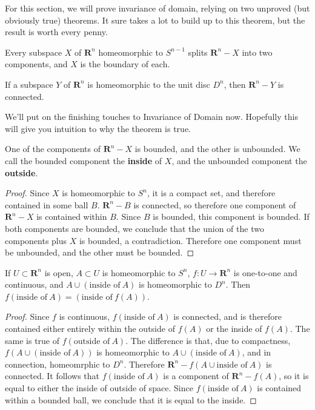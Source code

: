 For this section, we will prove invariance of domain, relying on two unproved (but obviously true) theorems. It sure takes a lot to build up to this theorem, but the result is worth every penny.

\begin{theorem}
    Every subspace $X$ of $\mathbf{R}^n$ homeomorphic to $S^{n-1}$ splits $\mathbf{R}^n - X$ into two components, and $X$ is the boundary of each.
\end{theorem}

\begin{theorem}
    If a subspace $Y$ of $\mathbf{R}^n$ is homeomorphic to the unit disc $D^n$, then $\mathbf{R}^n - Y$ is connected.
\end{theorem}

We'll put on the finishing touches to Invariance of Domain now. Hopefully this will give you intuition to why the theorem is true.

\begin{lemma}
    One of the components of $\mathbf{R}^n - X$ is bounded, and the other is unbounded. We call the bounded component the {\bf inside} of $X$, and the unbounded component the {\bf outside}.
\end{lemma}
\begin{proof}
    Since $X$ is homeomorphic to $S^n$, it is a compact set, and therefore contained in some ball $B$. $\mathbf{R}^n - B$ is connected, so therefore one component of $\mathbf{R}^n - X$ is contained within $B$. Since $B$ is bounded, this component is bounded. If both components are bounded, we conclude that the union of the two components plus $X$ is bounded, a contradiction. Therefore one component must be unbounded, and the other must be bounded.
\end{proof}

\begin{lemma}
    If $U \subset \mathbf{R}^n$ is open, $A \subset U$ is homeomorphic to $S^n$, $f:U \to \mathbf{R}^n$ is one-to-one and continuous, and $A \cup (\text{inside of}\ A)$ is homeomorphic to $D^n$. Then $f(\text{inside of}\ A) = (\text{inside of}\ f(A))$.
\end{lemma}
\begin{proof}
    Since $f$ is continuous, $f(\text{inside of}\ A)$ is connected, and is therefore contained either entirely within the outside of $f(A)$ or the inside of $f(A)$. The same is true of $f(\text{outside of}\ A)$. The difference is that, due to compactness, $f(A \cup (\text{inside of}\ A))$ is homeomorphic to $A \cup (\text{inside of}\ A)$, and in connection, homeomrphic to $D^n$. Therefore $\mathbf{R}^n - f(A \cup \text{inside of}\ A)$ is connected. It follows that $f(\text{inside of}\ A)$ is a component of $\mathbf{R}^n - f(A)$, so it is equal to either the inside of outside of space. Since $f(\text{inside of}\ A)$ is contained within a bounded ball, we conclude that it is equal to the inside.
\end{proof}

